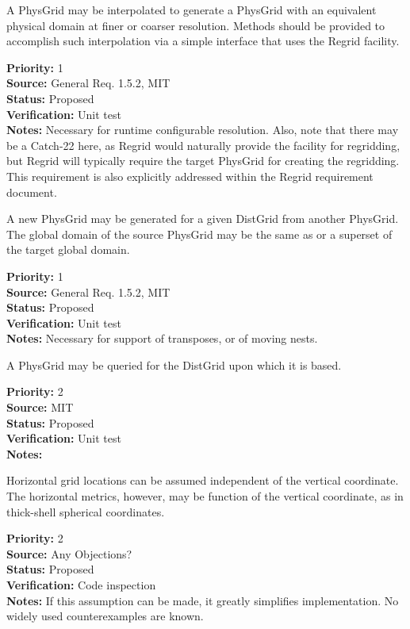 A PhysGrid may be interpolated to generate a PhysGrid with an equivalent physical
domain at finer or coarser resolution.  Methods should be provided to accomplish such
interpolation via a simple interface that uses the Regrid facility.
\begin{reqlist}
{\bf Priority:} 1 \\
{\bf Source:} General Req. 1.5.2, MIT \\
{\bf Status:} Proposed \\
{\bf Verification:} Unit test\\
{\bf Notes:} Necessary for runtime configurable resolution.  Also, note that 
there may be a Catch-22 here, as Regrid would naturally provide the facility
for regridding, but Regrid will typically require the target PhysGrid for
creating the regridding.  This requirement is also explicitly addressed within the
Regrid requirement document.
\end{reqlist}

A new PhysGrid may be generated for a given DistGrid from another PhysGrid.
The global domain of the source PhysGrid may be the same as or a superset of
the target global domain.
\begin{reqlist}
{\bf Priority:} 1 \\
{\bf Source:} General Req. 1.5.2, MIT \\
{\bf Status:} Proposed \\
{\bf Verification:} Unit test\\
{\bf Notes:} Necessary for support of transposes, or of moving nests.
\end{reqlist}

A PhysGrid may be queried for the DistGrid upon which it is based.
\begin{reqlist}
{\bf Priority:} 2 \\
{\bf Source:}  MIT\\
{\bf Status:} Proposed \\
{\bf Verification:} Unit test \\
{\bf Notes:} 
\end{reqlist}

Horizontal grid locations can be assumed independent of the vertical coordinate.
The horizontal metrics, however, may be function of the vertical coordinate, as
in thick-shell spherical coordinates.
\begin{reqlist}
{\bf Priority:} 2 \\
{\bf Source:} Any Objections? \\
{\bf Status:} Proposed \\
{\bf Verification:} Code inspection\\
{\bf Notes:} If this assumption can be made, it greatly simplifies implementation.
No widely used counterexamples are known.
\end{reqlist}

